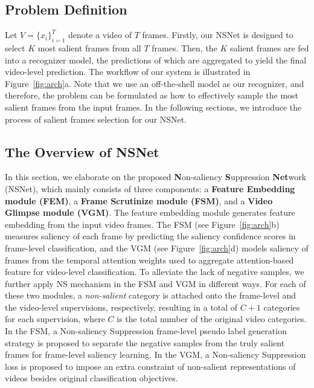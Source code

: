 \documentclass[runningheads]{llncs}
\newcommand{\figref}[1]{Figure~\ref{#1}}
\begin{document}
\subsection{Problem Definition}\label{subsec:Problem Formulation}
Let $V=\{x_i\}_{i=1}^T$ denote a video of $T$ frames. Firstly, our NSNet is designed to select $K$ most salient frames from all $T$ frames. Then, the $K$ salient frames are fed into a recognizer model, the predictions of which are aggregated to yield the final video-level prediction. The workflow of our system is illustrated in  \figref{fig:arch}a. Note that we use an off-the-shell model as our recognizer, and therefore, the problem can be formulated as how to effectively sample the most salient frames from the input frames. In the following sections, we introduce the process of salient frames selection for our NSNet.
\subsection{The Overview of NSNet}
In this section, we elaborate on the proposed \textbf{N}on-saliency \textbf{S}uppression \textbf{Net}work (NSNet), which mainly consists of three components: a \textbf{Feature Embedding module (FEM)}, a \textbf{Frame Scrutinize module (FSM)}, and a \textbf{Video Glimpse module (VGM)}. The feature embedding module generates feature embedding from the input video frames. The FSM (see \figref{fig:arch}b) measures saliency of each frame by predicting the saliency confidence scores in frame-level classification, and the VGM (see \figref{fig:arch}d) models saliency of frames from the temporal attention weights used to aggregate attention-based feature for video-level classification. To alleviate the lack of negative samples, we further apply NS mechanism in the FSM and VGM in different ways. For each of these two modules, a \emph{non-salient} category is attached onto the frame-level and the video-level supervisions, respectively, resulting in a total of $C+1$ categories for each supervision, where $C$ is the total number of the original video categories. In the FSM, a Non-saliency Suppression frame-level pseudo label generation strategy is proposed to separate the negative samples from the truly salient frames for frame-level saliency learning. In the VGM, a Non-saliency Suppression loss is proposed to impose an extra constraint of non-salient representations of videos besides original classification objectives.
\end{document}
